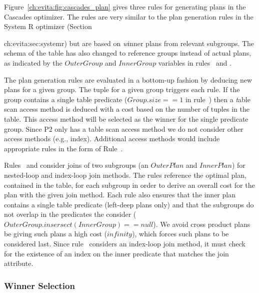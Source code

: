 Figure~\ref{ch:evita:fig:cascades_plan} gives three rules for generating plans
in the Cascades optimizer.  The rules are very similar to the plan generation
rules in the System R optimizer (Section{ch:evita:sec:systemr) but are based on
{\emph winner} plans from relevant subgroups.  The schema of the 
table has also changed to reference groups instead of actual plans, as
indicated by the $OuterGroup$ and $InnerGroup$ variables in rules~ and
.

The plan generation rules are evaluated in a bottom-up fashion by deducing new
plans for a given group.  The  tuple for a given group triggers
each rule.  If the group contains a single table predicate ($Group.size == 1$
in rule~) then a {\emph table scan} access method is deduced with a cost based
on the number of tuples in the table.  This access method will be selected as
the winner for the single predicate group.  Since P2 only has a table scan
access method we do not consider other access methods (e.g., index).
Additional access methods would include appropriate rules in the form of
Rule~.

Rules~ and  consider joins of two subgroups (an $OuterPlan$ and
$InnerPlan$) for nested-loop and index-loop join methods.  The rules reference
the optimal plan, contained in the  table, for each subgroup in
order to derive an overall cost for the plan with the given join method.  Each
rule also ensures that the inner plan contains a single table predicate
(left-deep plans only) and that the subgroups do not overlap in the predicates
the consider ($OuterGroup.insersect(InnerGroup) == null$).  We avoid cross
product plans be giving such plans a high cost ($infinity$), which forces such
plans to be considered last.  Since rule~ considers an index-loop join
method, it must check for the existence of an index on the inner predicate that
matches the join attribute.

\subsubsection{Winner Selection}

}
